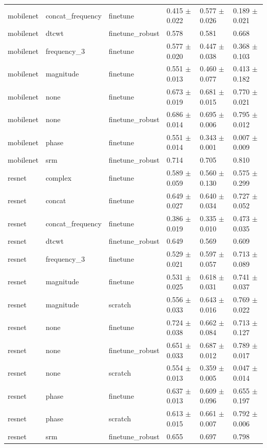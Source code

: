 \begin{table}
\begin{tabular}{llllll}
mobilenet & concat_frequency & finetune & 0.415 $\pm$ 0.022 & 0.577 $\pm$ 0.026 & 0.189 $\pm$ 0.021 \\
mobilenet & dtcwt & finetune_robust & 0.578 & 0.581 & 0.668 \\
mobilenet & frequency_3 & finetune & 0.577 $\pm$ 0.020 & 0.447 $\pm$ 0.038 & 0.368 $\pm$ 0.103 \\
mobilenet & magnitude & finetune & 0.551 $\pm$ 0.013 & 0.460 $\pm$ 0.077 & 0.413 $\pm$ 0.182 \\
mobilenet & none & finetune & 0.673 $\pm$ 0.019 & 0.681 $\pm$ 0.015 & 0.770 $\pm$ 0.021 \\
mobilenet & none & finetune_robust & 0.686 $\pm$ 0.014 & 0.695 $\pm$ 0.006 & 0.795 $\pm$ 0.012 \\
mobilenet & phase & finetune & 0.551 $\pm$ 0.014 & 0.343 $\pm$ 0.001 & 0.007 $\pm$ 0.009 \\
mobilenet & srm & finetune_robust & 0.714 & 0.705 & 0.810 \\
resnet & complex & finetune & 0.589 $\pm$ 0.059 & 0.560 $\pm$ 0.130 & 0.575 $\pm$ 0.299 \\
resnet & concat & finetune & 0.649 $\pm$ 0.027 & 0.640 $\pm$ 0.034 & 0.727 $\pm$ 0.052 \\
resnet & concat_frequency & finetune & 0.386 $\pm$ 0.019 & 0.335 $\pm$ 0.010 & 0.473 $\pm$ 0.035 \\
resnet & dtcwt & finetune_robust & 0.649 & 0.569 & 0.609 \\
resnet & frequency_3 & finetune & 0.529 $\pm$ 0.021 & 0.597 $\pm$ 0.057 & 0.713 $\pm$ 0.089 \\
resnet & magnitude & finetune & 0.531 $\pm$ 0.025 & 0.618 $\pm$ 0.031 & 0.741 $\pm$ 0.037 \\
resnet & magnitude & scratch & 0.556 $\pm$ 0.033 & 0.643 $\pm$ 0.016 & 0.769 $\pm$ 0.022 \\
resnet & none & finetune & 0.724 $\pm$ 0.038 & 0.662 $\pm$ 0.084 & 0.713 $\pm$ 0.127 \\
resnet & none & finetune_robust & 0.651 $\pm$ 0.033 & 0.687 $\pm$ 0.012 & 0.789 $\pm$ 0.017 \\
resnet & none & scratch & 0.554 $\pm$ 0.013 & 0.359 $\pm$ 0.005 & 0.047 $\pm$ 0.014 \\
resnet & phase & finetune & 0.637 $\pm$ 0.013 & 0.609 $\pm$ 0.096 & 0.655 $\pm$ 0.197 \\
resnet & phase & scratch & 0.613 $\pm$ 0.015 & 0.661 $\pm$ 0.007 & 0.792 $\pm$ 0.006 \\
resnet & srm & finetune_robust & 0.655 & 0.697 & 0.798 \\

\end{tabular}
\end{table}
